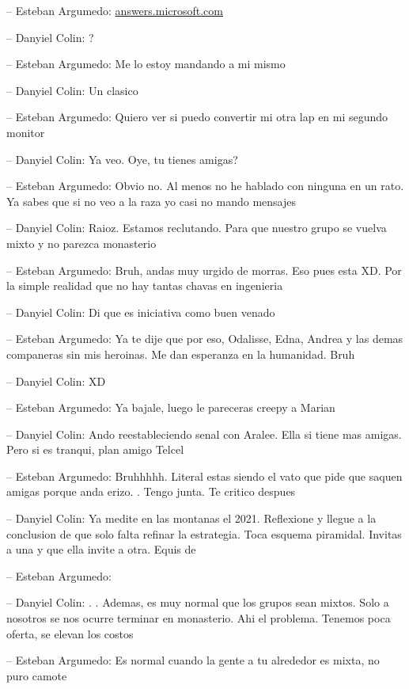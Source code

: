 -- Esteban Argumedo:
\href{https://answers.microsoft.com/es-es/windows/forum/all/windows-10-error-aun-seguimos-intentando/f70b80a6-c91d-479e-900e-d1f1707726fc}{answers.microsoft.com}

-- Danyiel Colin: ?

-- Esteban Argumedo: Me lo estoy mandando a mi mismo

-- Danyiel Colin: Un clasico

-- Esteban Argumedo: Quiero ver si puedo convertir mi otra lap en mi
segundo monitor

-- Danyiel Colin: Ya veo. Oye, tu tienes amigas?

-- Esteban Argumedo: Obvio no. Al menos no he hablado con ninguna en un
rato. Ya sabes que si no veo a la raza yo casi no mando mensajes

-- Danyiel Colin: Raioz. Estamos reclutando. Para que nuestro grupo se
vuelva mixto y no parezca monasterio

-- Esteban Argumedo: Bruh, andas muy urgido de morras. Eso pues esta XD.
Por la simple realidad que no hay tantas chavas en ingenieria

-- Danyiel Colin: Di que es iniciativa como buen venado

-- Esteban Argumedo: Ya te dije que por eso, Odalisse, Edna, Andrea y
las demas companeras sin mis heroinas. Me dan esperanza en la humanidad.
Bruh

-- Danyiel Colin: XD

-- Esteban Argumedo: Ya bajale, luego le pareceras creepy a Marian

-- Danyiel Colin: Ando reestableciendo senal con Aralee. Ella si tiene
mas amigas. Pero si es tranqui, plan amigo Telcel

-- Esteban Argumedo: Bruhhhhh. Literal estas siendo el vato que pide que
saquen amigas porque anda erizo. . Tengo junta. Te critico despues

-- Danyiel Colin: Ya medite en las montanas el 2021. Reflexione y llegue
a la conclusion de que solo falta refinar la estrategia. Toca esquema
piramidal. Invitas a una y que ella invite a otra. Equis de

-- Esteban Argumedo:

-- Danyiel Colin: . . Ademas, es muy normal que los grupos sean mixtos.
Solo a nosotros se nos ocurre terminar en monasterio. Ahi el problema.
Tenemos poca oferta, se elevan los costos

-- Esteban Argumedo: Es normal cuando la gente a tu alrededor es mixta,
no puro camote

